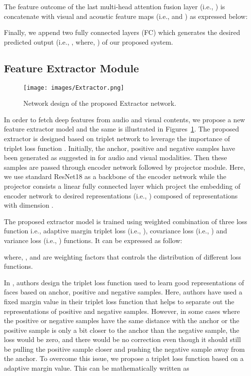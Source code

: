 \documentclass[10pt,twocolumn,letterpaper]{article}
\begin{document}
The feature outcome of the last multi-head attention fusion layer (i.e., ) is concatenate with visual and acoustic feature maps (i.e.,  and ) as expressed below:


Finally, we append two fully connected layers (FC) which generates the desired predicted output (i.e., , where,  ) of our proposed system.


\subsection{Feature Extractor Module}\label{sec:extractor}
\begin{figure}[t!]
    \centering
    \texttt{[image: images/Extractor.png]}
    \caption{Network design of the proposed Extractor network.}
    \label{fig:extractor}
\end{figure}
In order to fetch deep features from audio and visual contents, we propose a new feature extractor model and the same is illustrated in Figures~\ref{fig:extractor}. 
The proposed extractor is designed based on triplet network to leverage the importance of triplet loss function \cite{facenet}.
Initially, the anchor, positive and negative samples have been generated as suggested in \cite{facenet} for audio and visual modalities. Then these samples are passed through encoder network followed by projector module.
Here, we use standard ResNet18 \cite{resnet18} as a backbone of the encoder network while the projector consists a linear fully connected layer which project the embedding of encoder network to desired representations (i.e., ) composed of  representations with dimension . 

The proposed extractor model is trained using weighted combination of three loss function i.e., adaptive margin triplet loss (i.e., ), covariance loss (i.e., ) and variance loss (i.e., ) functions. It can be expressed as follow:

where, ,  and  are weighting factors that controls the distribution of different loss functions.

In \cite{facenet}, authors design the triplet loss function used to learn good representations of faces based on anchor, positive and negative samples. 
Here, authors have used a fixed margin value in their triplet loss function that helps to separate out the representations of positive and negative samples.
However, in some cases where the positive or negative samples have the same distance with the anchor or the positive sample is only a bit closer to the anchor than the negative sample, the loss would be zero, and there would be no correction even though it should still be pulling the positive sample closer and pushing the negative sample away from the anchor. To overcome this issue, we propose a triplet loss function based on a adaptive margin value. This can be mathematically written as 
\end{document}

